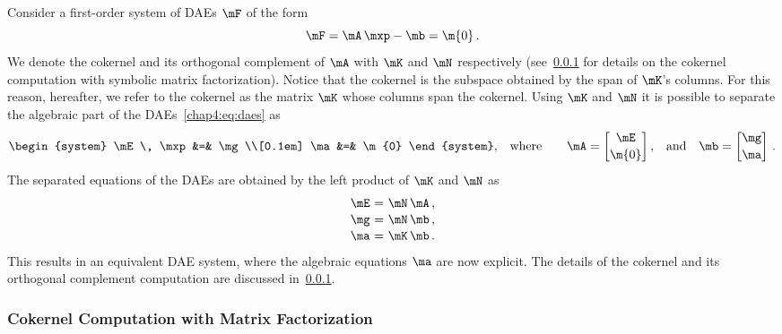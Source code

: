 Consider a first-order system of \acp{DAE} $\mF$ of the form
%
\begin{equation}
  \label{chap4:eq:daes}
  \mF = \mA \, \mxp - \mb = \m{0}  \, \text{.}
\end{equation}
%
We denote the cokernel and its orthogonal complement of $\mA$ with $\mK$ and $\mN$ respectively (see~\ref{chap4:sec:cokernel} for details on the cokernel computation with symbolic matrix factorization). Notice that the cokernel is the subspace obtained by the span of $\mK$'s columns. For this reason, hereafter, we refer to the cokernel as the matrix $\mK$ whose columns span the cokernel. Using $\mK$ and $\mN$ it is possible to separate the algebraic part of the \acp{DAE}~\eqref{chap4:eq:daes} as
%
\begin{equation}
  \label{chap4:eq:separated_daes}
  \begin{system}
    \mE \, \mxp &=& \mg \\[0.1em]
    \ma         &=& \m{0}
  \end{system} \text{,} \quad \text{where} \qquad \mA = \begin{bmatrix}
    \mE \\[0.2em]
    \m{0}
  \end{bmatrix} \text{,}
  \quad \text{and} \quad
  \mb = \begin{bmatrix}
     \mg \\[0.2em]
     \ma
  \end{bmatrix} \, \text{.}
\end{equation}
%
The separated equations of the \acp{DAE} are obtained by the left product of $\mK$ and $\mN$ as
%
\begin{equation*}
  \begin{array}{r@{~}c@{~}l}
    \mE &=& \mN \, \mA \, \text{,} \\[0.1em]
    \mg &=& \mN \, \mb \, \text{,} \\[0.1em]
    \ma &=& \mK \, \mb \, \text{.}
  \end{array}
\end{equation*}
%
This results in an equivalent \ac{DAE} system, where the algebraic equations $\ma$ are now explicit. The details of the cokernel and its orthogonal complement computation are discussed in~\ref{chap4:sec:cokernel}.


\subsubsection{Cokernel Computation with Matrix Factorization}
\label{chap4:sec:cokernel}

